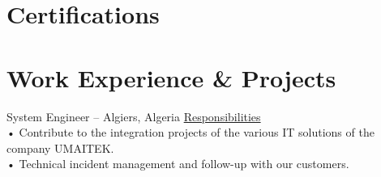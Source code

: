 \documentclass{cv}
\begin{document}
\section{Certifications}


\section{Work Experience \& Projects}

{System Engineer}
{\umtk -- Algiers, Algeria\vspace{.2cm}}
{
    \underline {Responsibilities}\vspace{.2cm}\\
    • Contribute to the integration projects of the various IT solutions of the company UMAITEK.\\
    • Technical incident management and follow-up with our customers.\\


}
\end{document}
